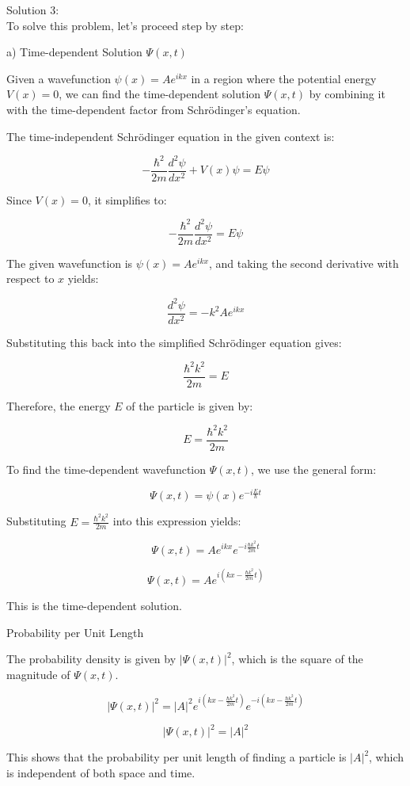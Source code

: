 \documentclass[a4paper,11pt]{article}
\begin{document}
\noindent Solution 3: \\ 

To solve this problem, let's proceed step by step:

a) Time-dependent Solution \( \Psi(x,t) \)

Given a wavefunction \( \psi(x) = Ae^{ikx} \) in a region where the potential energy \( V(x) = 0 \), we can find the time-dependent solution \( \Psi(x,t) \) by combining it with the time-dependent factor from Schrödinger's equation.

The time-independent Schrödinger equation in the given context is:

\[ -\frac{\hbar^2}{2m}\frac{d^2\psi}{dx^2} + V(x)\psi = E\psi \]

Since \( V(x) = 0 \), it simplifies to:

\[ -\frac{\hbar^2}{2m}\frac{d^2\psi}{dx^2} = E\psi \]

The given wavefunction is \( \psi(x) = Ae^{ikx} \), and taking the second derivative with respect to \( x \) yields:

\[ \frac{d^2\psi}{dx^2} = -k^2Ae^{ikx} \]

Substituting this back into the simplified Schrödinger equation gives:

\[ \frac{\hbar^2k^2}{2m} = E \]

Therefore, the energy \( E \) of the particle is given by:

\[ E = \frac{\hbar^2k^2}{2m} \]

To find the time-dependent wavefunction \( \Psi(x,t) \), we use the general form:

\[ \Psi(x,t) = \psi(x)e^{-i\frac{E}{\hbar}t} \]

Substituting \( E = \frac{\hbar^2k^2}{2m} \) into this expression yields:

\[ \Psi(x,t) = Ae^{ikx}e^{-i\frac{\hbar k^2}{2m}t} \]

\[ \Psi(x,t) = Ae^{i(kx - \frac{\hbar k^2}{2m}t)} \]

This is the time-dependent solution.

Probability per Unit Length

The probability density is given by \( |\Psi(x,t)|^2 \), which is the square of the magnitude of \( \Psi(x,t) \).

\[ |\Psi(x,t)|^2 = |A|^2e^{i(kx - \frac{\hbar k^2}{2m}t)}e^{-i(kx - \frac{\hbar k^2}{2m}t)} \]

\[ |\Psi(x,t)|^2 = |A|^2 \]

This shows that the probability per unit length of finding a particle is \( |A|^2 \), which is independent of both space and time.
\end{document}
